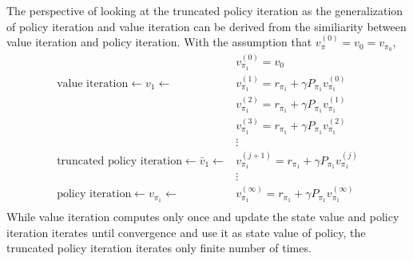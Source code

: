         The perspective of looking at the truncated policy iteration as the generalization of policy iteration and value iteration
        can be derived from the similiarity between value iteration and policy iteration.
        With the assumption that $v_\pi^{(0)}=v_0=v_{\pi_0}$,
        \begin{align}
        &v_{\pi_1}^{(0)} = v_0 \\
        \text{value iteration}\leftarrow v_1 \longleftarrow &v_{\pi_1}^{(1)} = r_{\pi_1} + \gamma P_{\pi_1}v_{\pi_1}^{(0)} \\
        &v_{\pi_1}^{(2)} = r_{\pi_1} + \gamma P_{\pi_1}v_{\pi_1}^{(1)} \\
        &v_{\pi_1}^{(3)} = r_{\pi_1} + \gamma P_{\pi_1}v_{\pi_1}^{(2)} \\
        &\vdots \\
        \text{truncated policy iteration}\leftarrow \bar{v}_1 \longleftarrow &v_{\pi_1}^{(j+1)} = r_{\pi_1} + \gamma P_{\pi_1}v_{\pi_1}^{(j)} \\
        &\vdots \\
        \text{policy iteration}\leftarrow v_{\pi_1} \longleftarrow &v_{\pi_1}^{(\infty)} = r_{\pi_1} + \gamma P_{\pi_1}v_{\pi_1}^{(\infty)} \\
        \end{align}
        While value iteration computes only once and update the state value and policy iteration iterates until convergence and use it as state value of policy,
        the truncated policy iteration iterates only finite number of times.
